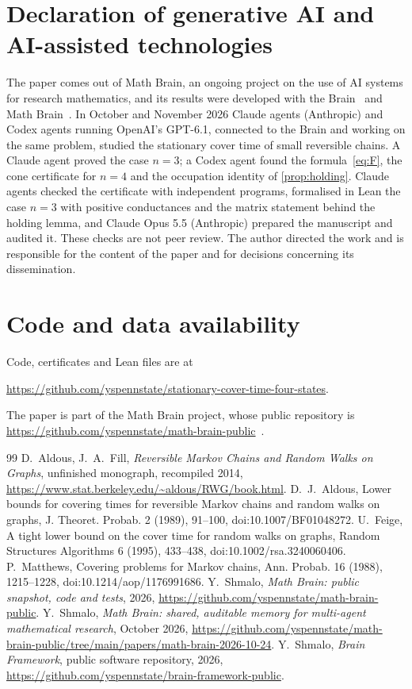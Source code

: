 \documentclass[11pt]{amsart}
\theoremstyle{remark}
\begin{document}
\section*{Declaration of generative AI and AI-assisted technologies}
The paper comes out of Math Brain, an ongoing project on the use of AI systems for research mathematics, and its
results were developed with the Brain~\cite{BrainFramework} and Math Brain~\cite{MathBrainRepo}. In October and
November 2026 Claude agents (Anthropic) and Codex agents running OpenAI's GPT-6.1, connected to the Brain and working
on the same problem, studied the stationary cover time of small reversible chains. A Claude agent proved the case
$n=3$; a Codex agent found the formula~\eqref{eq:F}, the cone certificate for $n=4$ and the occupation identity of
\cref{prop:holding}. Claude agents checked the certificate with independent programs, formalised in Lean the case $n=3$ with
positive conductances and the matrix statement behind the holding lemma, and Claude Opus 5.5 (Anthropic) prepared the manuscript and audited it. These checks are not peer
review. The author directed the work and is responsible for the content of the paper and for decisions concerning its
dissemination.

\section*{Code and data availability}
Code, certificates and Lean files are at

\url{https://github.com/yspennstate/stationary-cover-time-four-states}.

The paper is part of the Math Brain project, whose public repository is
\url{https://github.com/yspennstate/math-brain-public}~\cite{MathBrainRepo}.

\begin{thebibliography}{99}
 D.~Aldous, J.~A.~Fill, \emph{Reversible Markov Chains and Random Walks on Graphs}, unfinished monograph,
recompiled 2014, \url{https://www.stat.berkeley.edu/~aldous/RWG/book.html}.
 D.~J.~Aldous, Lower bounds for covering times for reversible Markov chains and random walks on graphs,
J. Theoret. Probab. 2 (1989), 91--100, doi:10.1007/BF01048272.
 U.~Feige, A tight lower bound on the cover time for random walks on graphs, Random Structures
Algorithms 6 (1995), 433--438, doi:10.1002/rsa.3240060406.
 P.~Matthews, Covering problems for Markov chains, Ann. Probab. 16 (1988), 1215--1228, doi:10.1214/aop/1176991686.
 Y.~Shmalo, \emph{Math Brain: public snapshot, code and tests}, 2026,
\url{https://github.com/yspennstate/math-brain-public}.
 Y.~Shmalo, \emph{Math Brain: shared, auditable memory for multi-agent mathematical research},
October 2026, \url{https://github.com/yspennstate/math-brain-public/tree/main/papers/math-brain-2026-10-24}.
 Y.~Shmalo, \emph{Brain Framework}, public software repository, 2026,
\url{https://github.com/yspennstate/brain-framework-public}.
\end{thebibliography}
\end{document}
